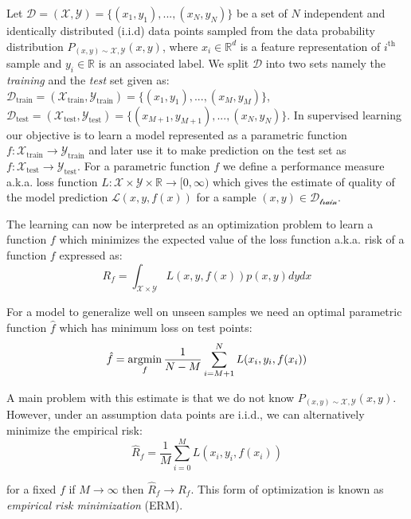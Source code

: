 Let $\mathcal{D}=(\mathcal{X},\mathcal{Y})=\{(x_1,y_1),...,(x_N,y_N)\}$ be a set of $N$ independent and identically distributed (i.i.d) data points sampled from the data probability distribution $P_{(x,y)\sim \mathcal{X},\mathcal{Y}}(x,y)$, where $x_i\in\mathbb{R}^d$ is a feature representation of $i^\text{th}$ sample and $y_i\in\mathbb{R}$ is an associated label. We split $\mathcal{D}$ into two sets namely the \emph{training} and the \emph{test} set given as:
$\mathcal{D}_\text{train}=(\mathcal{X}_\text{train},\mathcal{Y}_\text{train})=\{(x_1,y_1),...,(x_M,y_M)\}$, $\mathcal{D}_\text{test}=(\mathcal{X}_\text{test},\mathcal{Y}_\text{test})=\{(x_{M+1},y_{M+1}),...,(x_N,y_N)\}$. In supervised learning our objective is to learn a model represented as a parametric function $f:\mathcal{X}_\text{train}\rightarrow\mathcal{Y}_\text{train}$ and later use it to make prediction on the test set as $f:\mathcal{X}_\text{test}\rightarrow\mathcal{Y}_\text{test}$. For a parametric function $f$ we define a performance measure a.k.a. loss function $L:\mathcal{X}\times\mathcal{Y}\times\mathbb{R}\rightarrow[0,\infty)$ which gives the estimate of quality of the model prediction $\mathcal{L}(x,y,f(x))$ for a sample $(x,y)\in\mathcal{D_\text{train}}$. 

The learning can now be interpreted as an optimization problem to learn a function $f$ which minimizes the expected value of the loss function a.k.a. risk of a function $f$ expressed as:
\begin{equation}
    R_f = \int_{\mathcal{X}\times\mathcal{Y}}L(x,y,f(x))p(x,y)dydx
\end{equation}

For a model to generalize well on unseen samples we need an optimal parametric function $\hat{f}$ which has minimum loss on test points:
\begin{equation}
    \hat{f} = \operatorname*{argmin}_f \frac{1}{N-M} \sum_{i={M+1}}^N L(x_i,y_i,f(x_i))
\end{equation}

A main problem with this estimate is that we do not know $P_{(x,y)\sim \mathcal{X},\mathcal{Y}}(x,y)$. 
However, under an assumption data points are i.i.d., we can alternatively minimize the empirical risk:
\begin{equation}
    \hat{R}_f =  \frac{1}{M} \sum_{i=0}^M L(x_i,y_i,f(x_i))
\end{equation}

for a fixed $f$ if $M\rightarrow\infty$ then $\hat{R}_f\rightarrow R_f$. This form of optimization is known as \emph{empirical risk minimization} (ERM).  

